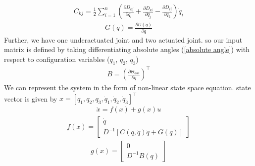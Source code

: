 \documentclass[letterpaper, 10 pt, conference]{ieeeconf}  %
\begin{document}
%
\begin{equation}
\begin{aligned}
    C_{kj} = \frac{1}{2} \sum_{i=1}^{n} \left( \frac{\partial D_{kj}}{\partial q_i} + \frac{\partial D_{ki}}{\partial q_j} - \frac{\partial D_{ij}}{\partial q_k} \right) \dot{q}_i
\end{aligned}
\label{Coriolis matrix}
\end{equation}
%
%
\begin{equation}
\begin{aligned}
     G(q) = \frac{\partial U(q)}{\partial q}
\end{aligned}
\label{gravity martix}
\end{equation}
%
Further, we have one underactuated joint and two actuated joint. so our input matrix is defined by taking differentiating absolute angles (\ref{absolute angle}) with respect to configuration variables ($q_1$, $q_2$, $q_3$)
%
\begin{equation}
\begin{aligned}
     B = \left(\frac{\partial \Theta_{abs}}{\partial q}\right)^\top
\end{aligned}
\label{input martix}
\end{equation}
%
We can represent the system in the form of non-linear state space equation. state vector is given by $x = [q_1,q_2,q_3,\dot{q}_1,\dot{q}_2,\dot{q}_3]^\top$ 
%
\begin{equation}
\begin{aligned}
    \dot{x} = f(x) + g(x)u 
\end{aligned}
\label{Non-linear eom}
\end{equation}
%
%
\begin{equation}
\begin{aligned}
    f(x) = \begin{bmatrix}
    \dot{q}\\
    D^{-1}\left[C(q,\dot{q})\dot{q} + G(q)\right]
    \end{bmatrix}
\end{aligned}
\label{Non-linear state matrix}
\end{equation}
%
\begin{equation}
\begin{aligned}
    g(x) = \begin{bmatrix}
    0\\
    D^{-1}B(q)
    \end{bmatrix}
\end{aligned}
\label{Non-linear input matrix}
\end{equation}
%
\end{document}
